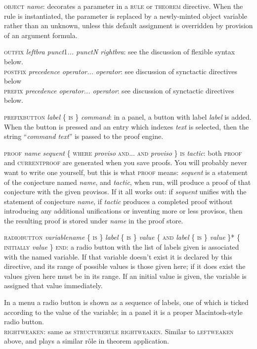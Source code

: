 \documentclass[11pt]{book}
\newcommand{\tab}{\hspace{5mm}}
\begin{document}
\textsc{object} \textit{name}: decorates a parameter in a \textsc{rule} or \textsc{theorem} directive. When the rule is instantiated, the parameter is replaced by a newly-minted object variable rather than an unknown, unless this default assignment is overridden by provision of an argument formula.


\textsc{outfix} \textit{leftbra punct}1\textit{... punctN rightbra}: see the discussion of flexible syntax below.\\
\textsc{postfix} \textit{precedence operator... operator}: see discussion of synctactic directives below\\
\textsc{prefix} \textit{precedence operator... operator}: see discussion of synctactic directives below.


\textsc{prefixbutton} \textit{label} \{ \textsc{is} \} \textit{command}: in a panel, a button with label \textit{label} is added. When the button is pressed and an entry which indexes \textit{text} is selected, then the string ``\textit{command text}'' is passed to the proof engine.


\textsc{proof} \textit{name sequent} \{ \textsc{where} \textit{proviso} \textsc{and... and} \textit{proviso} \textsc{\} is} \textit{tactic}: both \textsc{proof} and \textsc{currentproof} are generated when you save proofs. You will probably never want to write one yourself, but this is what \textsc{proof} means: \textit{sequent} is a statement of the conjecture named \textit{name}, and \textit{tactic}, when run, will produce a proof of that conjecture with the given provisos. If it all works out: if \textit{sequent} unifies with the statement of conjecture \textit{name}, if \textit{tactic} produces a completed proof without introducing any additional unifications or inventing more or less provisos, then the resulting proof is stored under \textit{name} in the proof store.


\textsc{radiobutton} \textit{variablename} \{ \textsc{is} \} \textit{label} \{ \textsc{is} \} \textit{value} \{ \textsc{and} \textit{label} \{ \textsc{is} \} \textit{value} \}* \{ \textsc{initially} \textit{value} \} \textsc{end}: a radio button with the list of labels given is associated with the named variable. If that variable doesn't exist it is declared by this directive, and its range of possible values is those given here; if it does exist the values given here must be in its range. If an initial value is given, the variable is assigned that value immediately.


\tab In a menu a radio button is shown as a sequence of labels, one of which is ticked according to the value of the variable; in a panel it is a proper Macintosh-style radio button.\\
\textsc{rightweaken}: same as \textsc{structurerule} \textsc{rightweaken}{\large .} Similar to \textsc{leftweaken} above, and plays a similar r\^{o}le in theorem application.
\end{document}
